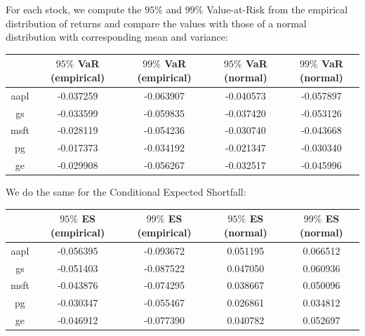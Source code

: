 \documentclass[10pt]{article}
\newenvironment{exercise}[2][Exercise]{\begin{trivlist}
  \item[\hskip \labelsep {\bfseries #1}\hskip \labelsep {\bfseries #2.}]}{\end{trivlist}}
\begin{document}
\begin{exercise}{3}
\begin{figure}[H]
		\end{figure}

	For each stock, we compute the $95\%$ and $99\%$ Value-at-Risk from the empirical distribution of returns and compare the values with those of a normal distribution with corresponding mean and variance:
	
	\begin{table}[h!]
		\centering
 		\begin{tabular}{||c c c c c||} 
 		\hline
		& $95\%$ VaR (empirical) & $99\%$ VaR (empirical)  & $95\%$ VaR (normal) & $99\%$ VaR (normal) \\ [0.5ex] 
 		\hline\hline
 		aapl & -0.037259 & -0.063907 & -0.040573 & -0.057897 \\ 
 		gs & -0.033599 & -0.059835 & -0.037420 & -0.053126 \\
 		msft & -0.028119 & -0.054236 & -0.030740 & -0.043668 \\
 		pg & -0.017373 & -0.034192 & -0.021347 & -0.030340 \\
 		ge & -0.029908 & -0.056267 & -0.032517 & -0.045996 \\ [1ex] 
 \hline
 		\end{tabular}
	\end{table}

	We do the same for the Conditional Expected Shortfall:
	
	\begin{table}[h!]
		\centering
 		\begin{tabular}{||c c c c c||} 
 		\hline
		& $95\%$ ES (empirical) & $99\%$ ES (empirical)  & $95\%$ ES (normal) & $99\%$ ES (normal) \\ [0.5ex] 
 		\hline\hline
 		aapl & -0.056395 & -0.093672 & 0.051195 & 0.066512 \\ 
 		gs & -0.051403 & -0.087522 & 0.047050 & 0.060936 \\
 		msft & -0.043876 & -0.074295 & 0.038667 & 0.050096 \\
 		pg & -0.030347 & -0.055467 & 0.026861 & 0.034812 \\
 		ge & -0.046912 & -0.077390 & 0.040782 & 0.052697 \\ [1ex] 
 \hline
 		\end{tabular}
	\end{table}

\end{exercise}
  
\end{document}
